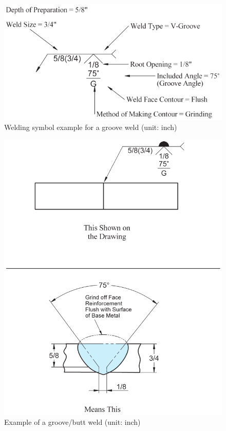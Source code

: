 \begin{figure}[H]
\centering
\includegraphics{PIC/CH07/EXAMPLE/BW}
\caption{Welding symbol example for a groove weld (unit: inch) \citep{Corgan2017}}
\end{figure}
\begin{figure}[H]
\centering
\includegraphics{PIC/CH07/EXAMPLE/BW2}
\caption{Example of a groove/butt weld (unit: inch) \citep{Corgan2017}}
\end{figure}
